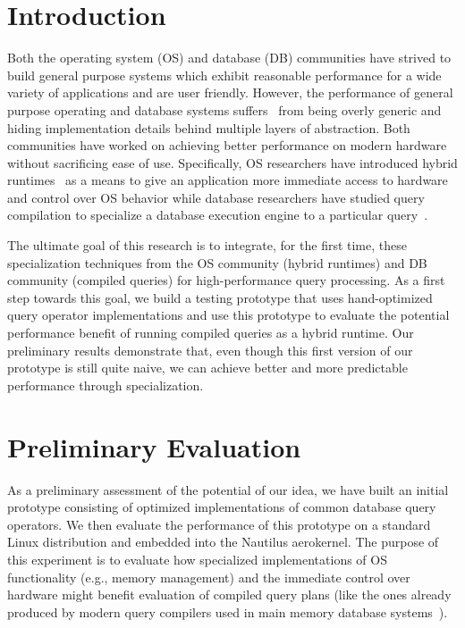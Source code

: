 \documentclass[conference]{IEEEtran}
\begin{document}
\section{Introduction}

  Both the operating system (OS) and database (DB) communities have strived to build general purpose systems which exhibit reasonable performance for a wide variety of applications and are user friendly.
  However, the performance of general purpose operating and database systems suffers~\cite{GICEVA:2016:OS_SUPPORT} from being overly generic and hiding implementation details behind multiple layers of abstraction.
Both communities have worked on achieving better performance on modern hardware without sacrificing ease of use. Specifically, OS researchers have introduced hybrid runtimes~\cite{HALE:2017:MULTIVERSE,HALE:2016:MULTIVERSE,HALE:2015:NAUTILUS,HALE:2016:HRTHVM} as a means to give an application more immediate access to hardware and control over OS behavior while database researchers have studied query compilation to specialize a database execution engine to a particular query~\cite{SK16,N11}.

The ultimate goal of this research is to integrate, for the first time, these specialization techniques from the OS community (hybrid runtimes) and DB community (compiled queries) for high-performance query processing.
As a first step towards this goal, we build a testing prototype that uses hand-optimized query operator implementations and use this prototype to evaluate the potential performance benefit of running compiled queries as a hybrid runtime.
%
Our preliminary results demonstrate that, even though this first version of our prototype is still quite naive, we can achieve better and more predictable performance through specialization.
%





\section{Preliminary Evaluation}

As a preliminary assessment of the potential of our idea, we have built an initial prototype consisting of optimized implementations of common database query operators. We then evaluate the performance of this prototype on a standard Linux distribution and embedded into the Nautilus aerokernel. The purpose of this experiment is to evaluate how specialized implementations of OS functionality (e.g., memory management) and the immediate control over hardware might benefit evaluation of compiled query plans (like the ones already produced by modern query compilers used in main memory database systems~\cite{N11}). 
\end{document}
